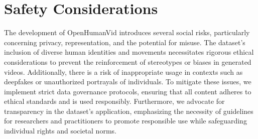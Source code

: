 \section{Safety Considerations}
The development of OpenHumanVid introduces several social risks, particularly concerning privacy, representation, and the potential for misuse. The dataset's inclusion of diverse human identities and movements necessitates rigorous ethical considerations to prevent the reinforcement of stereotypes or biases in generated videos. Additionally, there is a risk of inappropriate usage in contexts such as deepfakes or unauthorized portrayals of individuals. To mitigate these issues, we implement strict data governance protocols, ensuring that all content adheres to ethical standards and is used responsibly. Furthermore, we advocate for transparency in the dataset's application, emphasizing the necessity of guidelines for researchers and practitioners to promote responsible use while safeguarding individual rights and societal norms.

% 
% 
% 

